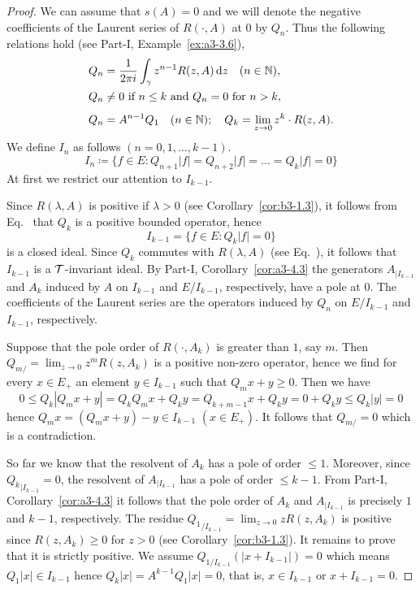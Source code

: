 \begin{proof}
	We can assume that $s(A) = 0$ and we will denote the negative coefficients of the Laurent series of\/ $R(\cdot,A)$ at $0$ by $Q_{n}$.
	Thus the following relations hold (see Part-I, Example~\ref{ex:a3-3.6}),
	\begin{equation}\label{eq:b3-2.17}
	\begin{split}
		Q_{n} &= \frac{1}{2\pi i}\int_{\gamma} z^{n-1}R(z,A)  \diff{z} \quad (n \in \N) ,  \\
		Q_{n} &\neq 0 \text{ if } n \leq k \text{ and } Q_{n} = 0 \text{ for } n > k ,  \\
		\rule{0ex}{3ex} Q_{n} &= A^{n-1}Q_{1} \quad (n \in \N); \quad Q_{k} = \lim_{z \to 0}z^{k}\cdot R(z,A).
	\end{split}
	\end{equation}
	We define $I_{n}$ as follows $(n = 0,1,\ldots,k-1)$.
	\[
	I_{n} \coloneq \{f \in E \colon Q_{n+1}|f| = Q_{n+2}|f| = \ldots = Q_{k}|f| = 0\}
	\]
	At first we restrict our attention to $I_{k-1}$.
	
	Since $R(\lambda,A)$ is positive if\/ $\lambda > 0$ (see Corollary~\ref{cor:b3-1.3}), it follows from Eq.~ that $Q_{k}$ is a positive bounded operator, hence 
    \[
    I_{k-1} = \{f \in E \colon Q_{k}|f| = 0\}
    \]
    is a closed ideal.
	Since $Q_{k}$ commutes with $R(\lambda,A)$ (see Eq.~), it follows that $I_{k-1}$ is a $\mathcal{T}$-invariant ideal.
	By Part-I, Corollary~\ref{cor:a3-4.3} the generators $A_{|I_{k-1}}$ and $A_{k}$ induced by $A$ on $I_{k-1}$ and $E/I_{k-1}$, respectively, have a pole at $0$.
	The coefficients of the Laurent series are the operators induced by $Q_{n}$ on $E/I_{k-1}$ and $I_{k-1}$, respectively.
	
	Suppose that the pole order of\/ $R(\cdot,A_{k})$ is greater than $1$, say $m$.
	Then $Q_{m/} = \lim_{z \to 0}z^{m}R(z,A_{k})$ is a positive non-zero operator, hence we find for every $x \in E_{+}$ an element $y \in I_{k-1}$ such that $Q_{m}x + y \geq 0$.
	Then we have
	\[
	0 \leq Q_{k}|Q_{m}x + y| = Q_{k}Q_{m}x + Q_{k}y = Q_{k+m-1}x + Q_{k}y = 0 + Q_{k}y \leq Q_{k}|y| = 0
	\]
	hence $Q_{m}x = (Q_{m}x + y) - y \in I_{k-1}$ $(x \in E_{+})$.
	It follows that $Q_{m/} = 0$ which is a contradiction.
	
	So far we know that the resolvent of\/ $A_{k}$ has a pole of order $\leq 1$.
	Moreover, since ${Q_{k}}_{|I_{k-1}} = 0$, 
	the resolvent of\/ $A_{|I_{k-1}}$ has a pole of order $\leq k-1$.
	From Part-I, Corollary~\ref{cor:a3-4.3} it follows that the pole order of\/ $A_{k}$ and $A_{|I_{k-1}}$ is precisely $1$ and $k-1$, respectively.
	The residue ${Q_{1}}_{/I_{k-1}} = \lim_{z \to 0}zR(z,A_{k})$ is positive since $R(z,A_{k}) \geq 0$ for $z > 0$ (see Corollary~\ref{cor:b3-1.3}).
	It remains to prove that it is strictly positive. We assume $Q_{1/I_{k-1}}(|x + I_{k-1}|) = 0$ which means $Q_{1}|x| \in I_{k-1}$ hence $Q_{k}|x| = A^{k-1}Q_{1}|x| = 0$, that is, $x \in I_{k-1}$ or $x + I_{k-1} = 0$.
	

\end{proof}
